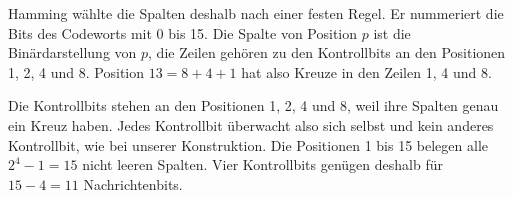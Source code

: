 Hamming wählte die Spalten deshalb nach einer festen Regel. Er
nummeriert die Bits des Codeworts mit 0 bis 15. Die Spalte von
Position \(p\) ist die Binärdarstellung von \(p\), die Zeilen
gehören zu den Kontrollbits an den Positionen 1, 2, 4 und 8.
Position \(13=8+4+1\) hat also Kreuze in den Zeilen 1, 4 und 8.

\begin{center}
\end{center}

Die Kontrollbits stehen an den Positionen 1, 2, 4 und 8, weil
ihre Spalten genau ein Kreuz haben. Jedes Kontrollbit überwacht
also sich selbst und kein anderes Kontrollbit, wie bei unserer
Konstruktion. Die Positionen 1 bis 15 belegen alle
\(2^4-1=15\) nicht leeren Spalten. Vier Kontrollbits genügen
deshalb für \(15-4=11\) Nachrichtenbits.

